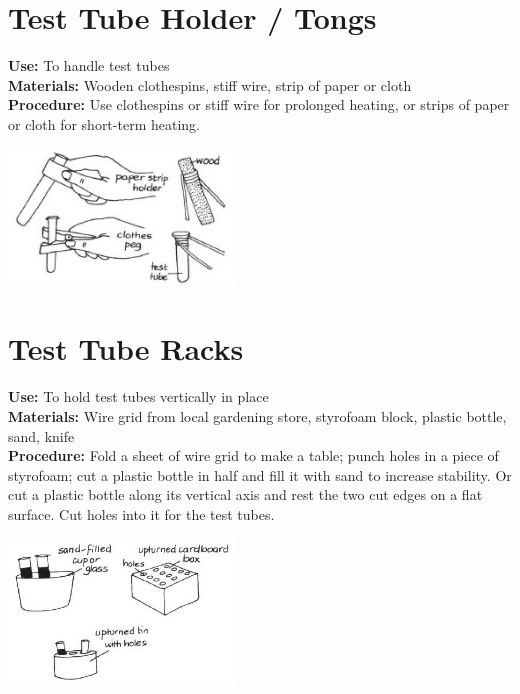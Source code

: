 \begin{multicols}{2}
\section{Test Tube Holder / Tongs}
\label{sec:test-tube-holder}
\vspace{-10pt}
\textbf{Use:} To handle test tubes\\
\textbf{Materials:} Wooden clothespins, stiff wire, strip of paper or cloth\\
\textbf{Procedure:} Use clothespins or stiff wire for prolonged heating, or strips of paper or cloth for short-term heating.
\begin{center}
\includegraphics[width=0.45\textwidth]{./img/vso/test-tube-holder.jpg}
\end{center}

\section{Test Tube Racks}
\label{sec:test-tube-racks}
\vspace{-10pt}
\textbf{Use:} To hold test tubes vertically in place\\
\textbf{Materials:} Wire grid from local gardening store, styrofoam block, plastic bottle, sand, knife\\
\textbf{Procedure:} Fold a sheet of wire grid to make a table; punch holes in a piece of styrofoam; cut a plastic bottle in half and fill it with sand to increase stability. Or cut a plastic bottle along its vertical axis and rest the two cut edges on a flat surface. Cut holes into it for the test tubes.
\begin{center}
\includegraphics[width=0.45\textwidth]{./img/vso/test-tube-rack.jpg}
\end{center}


\end{multicols}
